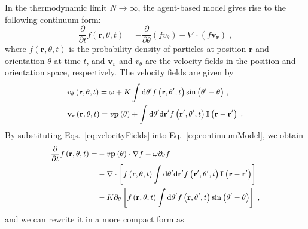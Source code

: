 \documentclass[a4paper, amsfonts, amssymb, amsmath, reprint, showkeys, showpacs, nofootinbib, twoside]{revtex4-2}
\begin{document}
In the thermodynamic limit $N\rightarrow \infty$, the agent-based model gives rise to the following continuum form:
\begin{equation}
    \frac{\partial}{\partial t}f\left( \mathbf{r},\theta ,t \right) =-\frac{\partial}{\partial \theta}\left( fv_{\theta} \right) -\nabla \cdot \left( f\mathbf{v}_{\mathbf{r}} \right) \;, \label{eq:continuumModel}
\end{equation}
where $f\left( \mathbf{r},\theta ,t \right)$ is the probability density of particles at position $\mathbf{r}$ and orientation $\theta$ at time $t$, and $\mathbf{v}_{\mathbf{r}}$ and $v_{\theta}$ are the velocity fields in the position and orientation space, respectively. The velocity fields are given by
\begin{subequations}
    \small
    \begin{align}
        &v_{\theta}\left( \mathbf{r},\theta ,t \right) =\omega +K\int{\mathrm{d}\theta ^{\prime}f\left( \mathbf{r},\theta ^{\prime},t \right) \sin \left( \theta ^{\prime}-\theta \right)}\;,\\
        &\mathbf{v}_{\mathbf{r}}\left( \mathbf{r},\theta ,t \right) =v\mathbf{p}\left( \theta \right) +\int{\mathrm{d}\theta ^{\prime}\mathrm{d}\mathbf{r}^{\prime}f\left( \mathbf{r}^{\prime},\theta ^{\prime},t \right) \mathbf{I}\left( \mathbf{r}-\mathbf{r}^{\prime} \right) \;.}
    \end{align}
    \label{eq:velocityFields}
\end{subequations}
By substituting Eqs.~\eqref{eq:velocityFields} into Eq.~\eqref{eq:continuumModel}, we obtain
\begin{equation}
    \small
    \begin{aligned}
        \frac{\partial}{\partial t}f\left( \mathbf{r},\theta ,t \right) =&-v\mathbf{p}\left( \theta \right) \cdot \nabla f-\omega \partial _{\theta}f\\
        &-\nabla \cdot \left[ f\left( \mathbf{r},\theta ,t \right) \int{\mathrm{d}\theta ^{\prime}\mathrm{d}\mathbf{r}^{\prime}f\left( \mathbf{r}^{\prime},\theta ^{\prime},t \right) \mathbf{I}\left( \mathbf{r}-\mathbf{r}^{\prime} \right)} \right]\\
        &-K\partial _{\theta}\left[ f\left( \mathbf{r},\theta ,t \right) \int{\mathrm{d}\theta ^{\prime}f\left( \mathbf{r},\theta ^{\prime},t \right) \sin \left( \theta ^{\prime}-\theta \right)} \right] \;,\\
    \end{aligned}
\end{equation}
and we can rewrite it in a more compact form as
\end{document}

